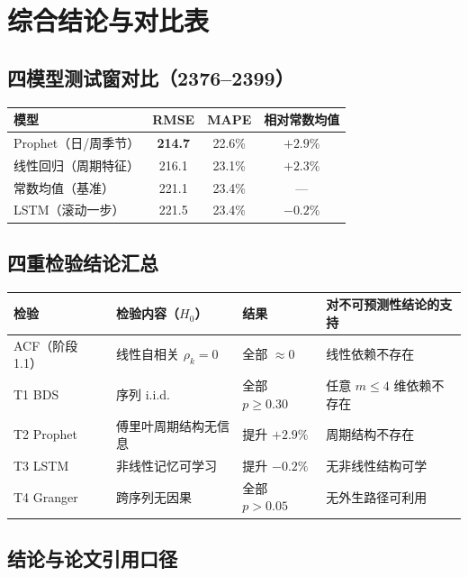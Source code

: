 \documentclass{internal-report}
\begin{document}
\section{综合结论与对比表}

\subsection{四模型测试窗对比（2376--2399）}

\begin{center}
\begin{tabular}{lccc}
\toprule
模型 & RMSE & MAPE & 相对常数均值 \\
\midrule
Prophet（日/周季节） & \textbf{214.7} & 22.6\% & $+2.9\%$ \\
线性回归（周期特征） & 216.1 & 23.1\% & $+2.3\%$ \\
常数均值（基准） & 221.1 & 23.4\% & --- \\
LSTM（滚动一步） & 221.5 & 23.4\% & $-0.2\%$ \\
\bottomrule
\end{tabular}
\end{center}

\subsection{四重检验结论汇总}

\begin{center}
\footnotesize
\begin{tabular}{p{2.6cm}p{4.6cm}p{2.2cm}p{4.6cm}}
\toprule
检验 & 检验内容（$H_0$） & 结果 & 对不可预测性结论的支持 \\
\midrule
ACF（阶段 1.1） & 线性自相关 $\rho_k=0$ & 全部 $\approx 0$ & 线性依赖不存在 \\
T1 BDS & 序列 i.i.d. & 全部 $p\ge 0.30$ & 任意 $m\le4$ 维依赖不存在 \\
T2 Prophet & 傅里叶周期结构无信息 & 提升 $+2.9\%$ & 周期结构不存在 \\
T3 LSTM & 非线性记忆可学习 & 提升 $-0.2\%$ & 无非线性结构可学 \\
T4 Granger & 跨序列无因果 & 全部 $p>0.05$ & 无外生路径可利用 \\
\bottomrule
\end{tabular}
\end{center}

\subsection{结论与论文引用口径}
\end{document}
